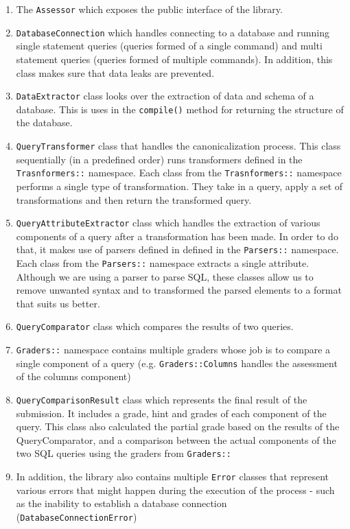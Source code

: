 \begin{enumerate}
    \item The \texttt{Assessor} which exposes the public interface of the library.
    \item \texttt{DatabaseConnection} which handles connecting to a database and running single statement queries (queries formed of a single command) and multi statement queries (queries formed of multiple commands). In addition, this class makes sure that data leaks are prevented.
    \item \texttt{DataExtractor} class looks over the extraction of data and schema of a database. This is uses in the \texttt{compile()} method for returning the structure of the database.
    \item \texttt{QueryTransformer} class that handles the canonicalization process. This class sequentially (in a predefined order) runs transformers defined in the \texttt{Trasnformers::} namespace. Each class from the \texttt{Trasnformers::} namespace performs a single type of transformation. They take in a query, apply a set of transformations and then return the transformed query.
    \item \texttt{QueryAttributeExtractor} class which handles the extraction of various components of a query after a transformation has been made. In order to do that, it makes use of parsers defined in defined in the \texttt{Parsers::} namespace. Each class from the \texttt{Parsers::} namespace extracts a single attribute. Although we are using a parser to parse SQL, these classes allow us to remove unwanted syntax and to transformed the parsed elements to a format that suits us better.
    \item \texttt{QueryComparator} class which compares the results of two queries.
    \item \texttt{Graders::} namespace contains multiple graders whose job is to compare a single component of a query (e.g. \texttt{Graders::Columns} handles the assessment of the columns component)
    \item \texttt{QueryComparisonResult} class which represents the final result of the submission. It includes a grade, hint and grades of each component of the query. This class also calculated the partial grade based on the results of the QueryComparator, and a comparison between the actual components of the two SQL queries using the graders from \texttt{Graders::}
    \item In addition, the library also contains multiple \texttt{Error} classes that represent various errors that might happen during the execution of the process - such as the inability to establish a database connection (\texttt{DatabaseConnectionError})
\end{enumerate}

